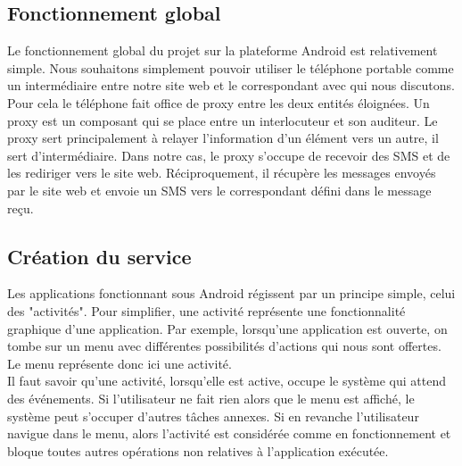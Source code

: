 \subsection{Fonctionnement global}

Le fonctionnement global du projet sur la plateforme Android est relativement simple. Nous souhaitons
simplement pouvoir utiliser le téléphone portable comme un intermédiaire entre notre site web et le 
correspondant avec qui nous discutons. Pour cela le téléphone fait office de proxy entre les deux 
entités éloignées. Un proxy est un composant qui se place entre un interlocuteur et son auditeur. Le 
proxy sert principalement à relayer l'information d'un élément vers un autre, il sert d'intermédiaire.
Dans notre cas, le proxy s'occupe de recevoir des SMS et de les rediriger vers le site web. 
Réciproquement, il récupère les messages envoyés par le site web et envoie un SMS vers le correspondant
défini  dans le message reçu.



\subsection{Création du service}

Les applications fonctionnant sous Android régissent par un principe simple, celui des "activités".
Pour simplifier, une activité représente une fonctionnalité graphique d'une application. Par exemple,
lorsqu'une application est ouverte, on tombe sur un menu avec différentes possibilités d'actions 
qui nous sont offertes. Le menu représente donc ici une activité.
\\


Il faut savoir qu’une activité, lorsqu'elle est active, occupe le système qui attend des événements.
Si l'utilisateur ne fait rien alors que le menu est affiché, le système peut s'occuper d'autres 
tâches annexes. Si en revanche l'utilisateur navigue dans le menu, alors l'activité est considérée
comme en fonctionnement et bloque toutes autres opérations non relatives à l'application exécutée.
\\


